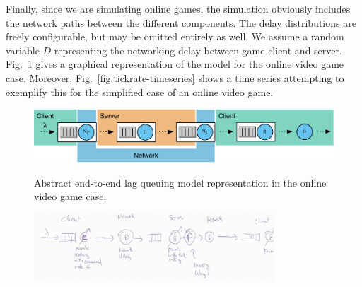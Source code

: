 Finally, since we are simulating online games, the simulation obviously 
includes the network paths between the different components. The delay 
distributions are freely configurable, but may be omitted entirely as well. We assume a random variable $D$ representing the networking delay between game client and server.
Fig.~\ref{fig:queuing-model} gives a graphical representation of the model for the online video game case.  Moreover, Fig.~\ref{fig:tickrate-timeseries} shows a time series attempting to exemplify this for the simplified case of an online video game.

\begin{figure}[!t]
	\centering
	\includegraphics[width=1.0\textwidth]{../models/e2e-lag-model.pdf}
	\caption{Abstract end-to-end lag queuing model representation in the online video game case. }
\label{fig:queuing-model}
\includegraphics[width=0.8\textwidth]{figure7-queueingModel.jpg}
\caption*{}
\end{figure}


